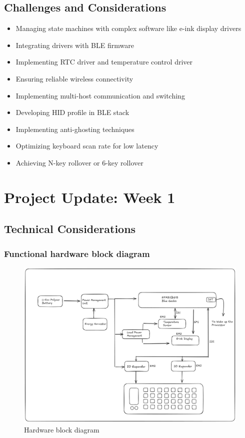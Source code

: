 \documentclass[a4paper,11pt]{article}%
\begin{document}
\subsection{Challenges and Considerations}
\begin{itemize}
\item Managing state machines with complex software like e-ink display drivers
\item Integrating drivers with BLE firmware
\item Implementing RTC driver and temperature control driver
\item Ensuring reliable wireless connectivity
\item Implementing multi-host communication and switching
\item Developing HID profile in BLE stack
\item Implementing anti-ghosting techniques
\item Optimizing keyboard scan rate for low latency
\item Achieving N-key rollover or 6-key rollover
\end{itemize}

\pagebreak
\section{\color{red}Project Update: Week 1}



\subsection{Technical Considerations}


\subsubsection{Functional hardware block diagram}

\begin{figure}[H]
    \centering
    \includegraphics[scale=0.32]{figures/blockdiagram.png}
    \caption{Hardware block diagram}
\end{figure}
\vspace{0.2cm}
\end{document}
